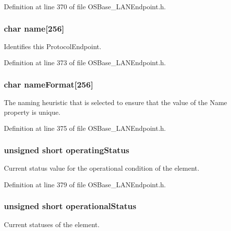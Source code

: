 Definition at line 370 of file OSBase\_\-LANEndpoint.h.\hypertarget{struct_l_a_n_endpoint_a8e03167ce04350be901b028cc4cf1ce1}{
\subsubsection[{name}]{\setlength{\rightskip}{0pt plus 5cm}char {\bf name}\mbox{[}256\mbox{]}}}
\label{struct_l_a_n_endpoint_a8e03167ce04350be901b028cc4cf1ce1}
Identifies this ProtocolEndpoint. 

Definition at line 373 of file OSBase\_\-LANEndpoint.h.\hypertarget{struct_l_a_n_endpoint_a6ae2d79a0b453f2f74f7ed37b65611dc}{
\subsubsection[{nameFormat}]{\setlength{\rightskip}{0pt plus 5cm}char {\bf nameFormat}\mbox{[}256\mbox{]}}}
\label{struct_l_a_n_endpoint_a6ae2d79a0b453f2f74f7ed37b65611dc}
The naming heuristic that is selected to ensure that the value of the Name property is unique. 

Definition at line 375 of file OSBase\_\-LANEndpoint.h.\hypertarget{struct_l_a_n_endpoint_a08774f9e8143e5d2e4e71dac9b13d900}{
\subsubsection[{operatingStatus}]{\setlength{\rightskip}{0pt plus 5cm}unsigned short {\bf operatingStatus}}}
\label{struct_l_a_n_endpoint_a08774f9e8143e5d2e4e71dac9b13d900}
Current status value for the operational condition of the element. 

Definition at line 379 of file OSBase\_\-LANEndpoint.h.\hypertarget{struct_l_a_n_endpoint_af6ba95b300b99b25169364341eed22cb}{
\subsubsection[{operationalStatus}]{\setlength{\rightskip}{0pt plus 5cm}unsigned short {\bf operationalStatus}}}
\label{struct_l_a_n_endpoint_af6ba95b300b99b25169364341eed22cb}
Current statuses of the element. 

